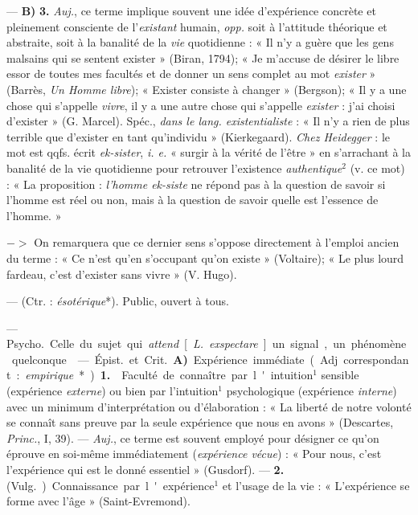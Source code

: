 \begin{itemize}[leftmargin=1cm, label=, itemsep=1pt]
— {\bf B)} {\bf 3.} {\it Auj.}, ce terme implique
souvent une idée d’expérience concrète et pleinement consciente de
l'{\it existant} humain, {\it opp.} soit à l’attitude théorique et
abstraite, soit à la banalité de la {\it vie} quotidienne :
« Il n’y a guère que les gens malsains
qui se sentent exister » (Biran,
1794); « Je m’accuse de désirer le
libre essor de toutes mes facultés et
de donner un sens complet au mot
{\it exister} » (Barrès, {\it Un Homme libre});
« Exister consiste à changer »
(Bergson); « Il y a une chose qui
s'appelle {\it vivre}, il y a une autre chose
qui s'appelle {\it exister} : j'ai choisi
d'exister » (G. Marcel). Spéc., {\it dans
le lang. existentialiste} : « Il n'y a
rien de plus terrible que d’exister
en tant qu'individu » (Kierkegaard).
{\it Chez Heidegger} : le mot est qqfs.
écrit {\it ek-sister}, {\it i. e.} « surgir à la vérité
de l'être » en s’arrachant à la banalité de la vie quotidienne pour
retrouver l'existence {\it authentique}$^2$ (v.
ce mot) : « La proposition : {\it l’homme
ek-siste} ne répond pas à la question
de savoir si l'homme est réel ou non,
mais à la question de savoir quelle
est l’essence de l’homme. »

$->$ On remarquera que ce dernier sens s'oppose directement à
l'emploi ancien du terme : « Ce n’est
qu'en s'occupant qu'on existe »
(Voltaire); « Le plus lourd fardeau,
c’est d'exister sans vivre » (V. Hugo).

 — (Ctr. : {\it ésotérique}*).
Public, ouvert à tous.

 — \si{Psycho.}
Celle du sujet qui {\it attend} [{\it L.} {\it exspectare}] un signal,
un phénomène quelconque.

 — \si{Épist.} et \si{Crit.} {\bf A)} \si{Expérience immédiate}. (Adj. correspondant : {\it empirique}*). {\bf 1.}  Faculté
de connaître par l'intuition$^1$ sensible (expérience {\it externe}) ou bien
par l'intuition$^1$ psychologique (expérience {\it interne}) avec un minimum
d'interprétation ou d'élaboration :
« La liberté de notre volonté se
connaît sans preuve par la seule
expérience que nous en avons »
(Descartes, {\it Princ.}, I, 39). —  {\it Auj.},
ce terme est souvent employé pour
désigner ce qu’on éprouve en soi-même immédiatement ({\it expérience
vécue}) : « Pour nous, c’est l’expérience qui est le donné essentiel »
(Gusdorf). — {\bf 2.}  (\si{Vulg.}) Connaissance par l'expérience$^1$ et l'usage
de la vie : « L'expérience se forme
avec l’âge » (Saint-Evremond).


\end{itemize}
